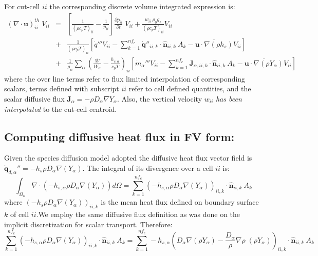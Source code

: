 For cut-cell $ii$ the corresponding discrete volume integrated expression is:
%
\begin{eqnarray}
    ( \nabla \cdot \mathbf{u} )_{ii}^{th} \; V_{ii} &=&
    \left[ \frac{1}{(\rho c_p T)_{ii}} - \frac{1}{\bar{p}_{ii}} \right]
    \frac{\partial \bar{p}_{ii}}{\partial t} \; V_{ii} +
    \frac{w_{ii} \: \rho_0 g_z}{(\rho c_p T)_{ii}} V_{ii} \nonumber \\
    &+& \frac{1}{(\rho c_p T)_{ii}} \left[ \dot{q}''' V_{ii} -
    \sum_{k=1}^{nf_c} \dot{\mathbf{q}}''_{ii,k} \cdot \hat{\mathbf{n}}_{ii,k} \: A_k
    - \overline{\mathbf{u} \cdot \nabla (\rho h_s)} V_{ii} \right] \nonumber \\
    &+& \frac{1}{\rho_{ii}} \sum_\alpha \left( \frac{\overline{W}}{W_\alpha} - \frac{h_{s,\alpha}}{c_p T} \right)_{ii} \left[ \dot{m}_\alpha''' V_{ii} -
    \sum_{k=1}^{nf_c} \mathbf{J}_{\alpha,ii,k} \cdot \hat{\mathbf{n}}_{ii,k} \: A_k
    - \overline{\mathbf{u} \cdot \nabla (\rho Y_\alpha)} V_{ii} \right] \label{eq:divth2}
\end{eqnarray}
%
where the over line terms refer to flux limited interpolation of corresponding scalars, terms defined with subscript $ii$ refer to cell defined quantities, and the scalar diffusive flux $\mathbf{J}_\alpha=- \rho D_\alpha \nabla Y_\alpha$. Also, the vertical velocity $w_{ii}$ \textit{has been interpolated} to the cut-cell centroid.

\subsection{Computing diffusive heat flux in FV form:}

Given the species diffusion model adopted the diffusive heat flux vector field is $\dot{\mathbf{q}}_{d,\alpha}''=-h_s \rho D_\alpha \nabla(Y_\alpha)$. The integral of its divergence over a cell $ii$ is:
\begin{equation}
    \int_{\Omega_{ii}} {\nabla \cdot \left(-h_{s,\alpha} \rho D_\alpha \nabla(Y_\alpha) \right)} d\Omega = \sum_{k=1}^{nf_c} \left(-h_{s,\alpha} \rho D_\alpha \nabla(Y_\alpha) \right)_{ii,k} \cdot \hat{\mathbf{n}}_{ii,k}  \: A_k
\end{equation}
where $\left(-h_s \rho D_\alpha \nabla(Y_\alpha) \right)_{ii,k}$ is the mean heat flux defined on boundary surface $k$ of cell $ii$.We employ the same diffusive flux definition as was done on the implicit discretization for scalar transport. Therefore:
\begin{equation}
    \sum_{k=1}^{nf_c} \left(-h_{s,\alpha} \rho D_\alpha \nabla(Y_\alpha) \right)_{ii,k} \cdot \hat{\mathbf{n}}_{ii,k}  \: A_k =
    \sum_{k=1}^{nf_c} -h_{s,\alpha} \left(D_\alpha \nabla(\rho Y_\alpha) -
    \frac{D_\alpha}{\rho} \nabla \rho \; (\rho Y_\alpha) \right)_{ii,k} \cdot \hat{\mathbf{n}}_{ii,k}  \: A_k
\end{equation}


